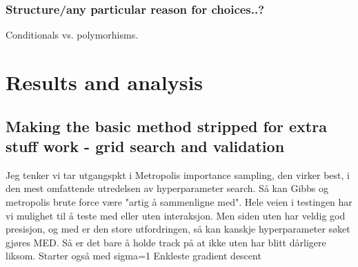 \documentclass[twoside,english]{uiofysmaster}
\begin{document}
\section{Structure/any particular reason for choices..?}
Conditionals vs. polymorhisms.

\part{Results and analysis}
\chapter{Making the basic method stripped for extra stuff work - grid search and validation}
Jeg tenker vi tar utgangspkt i Metropolis importance sampling, den virker best, i den mest omfattende utredelsen av hyperparameter search. Så kan Gibbs og metropolis brute force være "artig å sammenligne med". Hele veien i testingen har vi mulighet til å teste med eller uten interaksjon. Men siden uten har veldig god presisjon, og med er den store utfordringen, så kan kanskje hyperparameter søket gjøres MED. Så er det bare å holde track på at ikke uten har blitt dårligere liksom.
Starter også med sigma=1
Enkleste gradient descent
\end{document}
